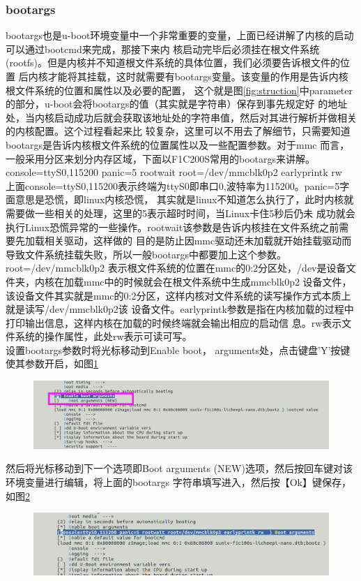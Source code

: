 \subsubsection{bootargs}
bootargs也是u-boot环境变量中一个非常重要的变量，上面已经讲解了内核的启动可以通过bootcmd来完成，那接下来内
核启动完毕后必须挂在根文件系统(rootfs)。但是内核并不知道根文件系统的具体位置，我们必须要告诉根文件的位置
后内核才能将其挂载，这时就需要有bootargs变量。该变量的作用是告诉内核根文件系统的位置和属性以及必要的配置，
这个就是图\ref{fig:struction}中parameter的部分，u-boot会将bootargs的值（其实就是字符串）保存到事先规定好
的地址处，当内核启动成功后就会获取该地址处的字符串值，然后对其进行解析并做相关的内核配置。这个过程看起来比
较复杂，这里可以不用去了解细节，只需要知道bootargs是告诉内核根文件系统的位置属性以及一些配置参数。对于mmc
而言，一般采用分区来划分内存区域，下面以F1C200S常用的bootargs来讲解。\\
console=ttyS0,115200 panic=5 rootwait root=/dev/mmcblk0p2 earlyprintk rw \\
上面console=ttyS0,115200表示终端为ttyS0即串口0,波特率为115200。panic=5字面意思是恐慌，即linux内核恐慌，
其实就是linux不知道怎么执行了，此时内核就需要做一些相关的处理，这里的5表示超时时间，当Linux卡住5秒后仍未
成功就会执行Linux恐慌异常的一些操作。rootwait该参数是告诉内核挂在文件系统之前需要先加载相关驱动，这样做的
目的是防止因mmc驱动还未加载就开始挂载驱动而导致文件系统挂载失败，所以一般bootargs中都要加上这个参数。root=/dev/mmcblk0p2
表示根文件系统的位置在mmc的0:2分区处，/dev是设备文件夹，内核在加载mmc中的时候就会在根文件系统中生成mmcblk0p2
设备文件，该设备文件其实就是mmc的0:2分区，这样内核对文件系统的读写操作方式本质上就是读写/dev/mmcblk0p2该
设备文件。earlyprintk参数是指在内核加载的过程中打印输出信息，这样内核在加载的时候终端就会输出相应的启动信
息。rw表示文件系统的操作属性，此处rw表示可读可写。\\
设置bootargs参数时将光标移动到Enable boot，
arguments处，点击键盘'Y'按键使其参数开启，如图\ref{fig:bootargs}
\begin{figure}[htbp]
	\centering
	\includegraphics[width=1\linewidth]{chapter2/img/bootargs}
	\caption{}
	\label{fig:bootargs}
\end{figure}
然后将光标移动到下一个选项即Boot arguments (NEW)选项，然后按回车键对该环境变量进行编辑，将上面的bootargs
字符串填写进入，然后按【Ok】键保存，如图\ref{fig:bootargssave}
\begin{figure}[htbp]
	\centering
	\includegraphics[width=1\linewidth]{chapter2/img/bootargssave}
	\caption{}
	\label{fig:bootargssave}
\end{figure}

